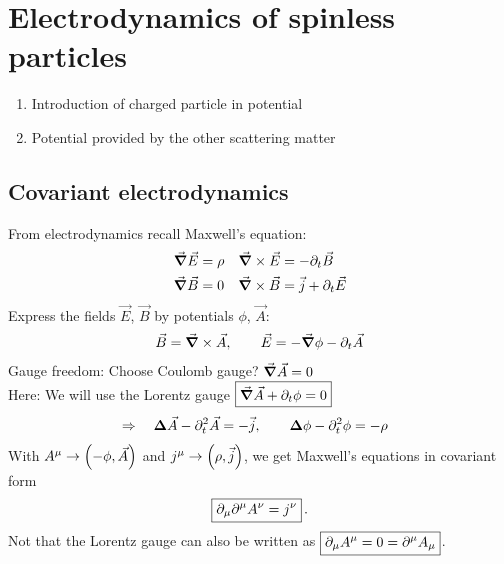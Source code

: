 \chapter{Electrodynamics of spinless particles}
\begin{enumerate}[1)]
    \item Introduction of charged particle in potential
    \item Potential provided by the other scattering matter
\end{enumerate}

\section{Covariant electrodynamics}
From electrodynamics recall Maxwell's equation:
\begin{align*}
    \vec \grad \vec E & = \rho   & \vec \grad \times \vec E & = - \partial_t \vec B \\
    \vec \grad \vec B & = 0      & \vec \grad \times \vec B & = \vec j + \partial_t \vec E
\end{align*}
Express the fields $\vec E$, $\vec B$ by potentials $\phi$, $\vec A$:
\begin{align}
    \vec B = \vec \grad \times \vec A, \qquad \vec E = - \vec \grad \phi - \partial_t \vec A
\end{align}
Gauge freedom: Choose Coulomb gauge? $\vec \grad \vec A = 0$\\
Here: We will use the Lorentz gauge $\boxed{\vec \grad \vec A + \partial_t \phi = 0}$
\begin{align}
    & \Rightarrow \quad \bm{\Delta} \vec A - \partial_t^2 \vec A = - \vec j, \qquad \bm{\Delta} \phi - \partial_t^2 \phi = - \rho
\end{align}
With $A^\mu \rightarrow \qty(-\phi, \vec A)$ and $j^\mu \rightarrow \qty(\rho, \vec j)$, we get Maxwell's equations in covariant form
\begin{align}
    \boxed{ \partial_\mu \partial^\mu A^\nu = j^\nu }\,.
\end{align}
Not that the Lorentz gauge can also be written as $\boxed{\partial_\mu A^\mu = 0 = \partial^\mu A_\mu}$.

